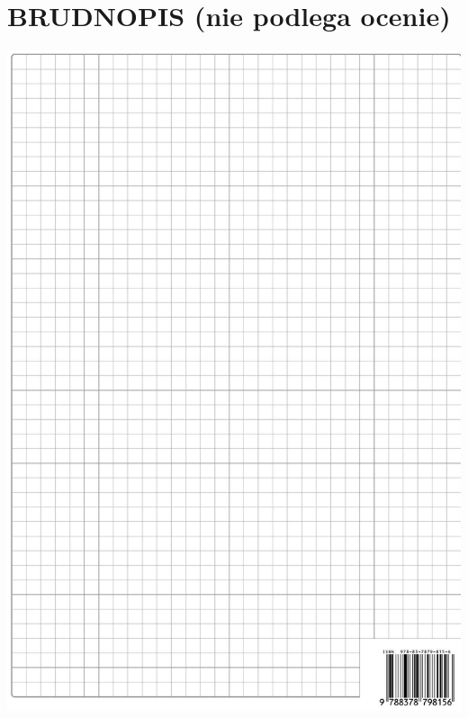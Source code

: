 \documentclass[10pt]{article}
\begin{document}
\section*{BRUDNOPIS (nie podlega ocenie)}
\begin{center}
\includegraphics[max width=\textwidth]{2024_11_21_724abc2cf5a71562f5b2g-16}
\end{center}
\end{document}
